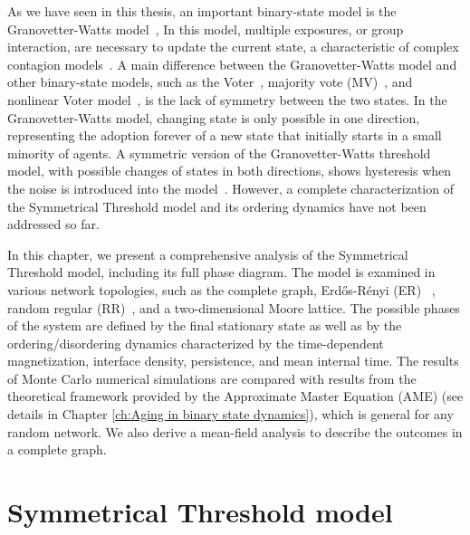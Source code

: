 As we have seen in this thesis, an important binary-state model is the Granovetter-Watts model~\cite{granovetter-1978, watts-2002}, In this model, multiple exposures, or group interaction, are necessary to update the current state, a characteristic of complex contagion models~\cite{centola-2007,unknown-author-2018}. A main difference between the Granovetter-Watts model and other binary-state models, such as the Voter~\cite{Voter-original}, majority vote (MV)~\cite{de1992isotropic,pereira2005majority,campos2003small}, and nonlinear Voter model~\cite{castellano-2009,mobilia2015nonlinear,mellor2016characterization,Min-2017,jewski-2017,peralta-2018}, is the lack of symmetry between the two states. In the Granovetter-Watts model, changing state is only possible in one direction, representing the adoption forever of a new state that initially starts in a small minority of agents. A symmetric version of the Granovetter-Watts threshold model, with possible changes of states in both directions, shows hysteresis when the noise is introduced into the model~\cite{nowak2019homogeneous,nowak2020symmetrical}. However, a complete characterization of the Symmetrical Threshold model and its ordering dynamics have not been addressed so far.

In this chapter, we present a comprehensive analysis of the Symmetrical Threshold model, including its full phase diagram. The model is examined in various network topologies, such as the complete graph, Erd\H{o}s-Rényi (ER) ~\cite{erdos1960evolution}, random regular (RR)~\cite{wormald_1999}, and a two-dimensional Moore lattice. The possible phases of the system are defined by the final stationary state as well as by the ordering/disordering dynamics characterized by the time-dependent magnetization, interface density, persistence, and mean internal time. The results of Monte Carlo numerical simulations are compared with results from the theoretical framework provided by the Approximate Master Equation (AME) (see details in Chapter \ref{ch:Aging in binary state dynamics}), which is general for any random network. We also derive a mean-field analysis to describe the outcomes in a complete graph.

\section{\label{Symmetrical Threshold model} Symmetrical Threshold model}

